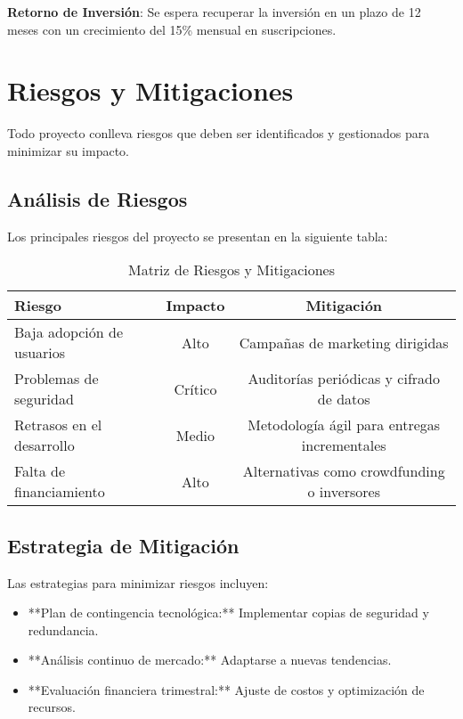 \textbf{Retorno de Inversión}: Se espera recuperar la inversión en un plazo de 12 meses con un crecimiento del 15\% mensual en suscripciones.



\section{Riesgos y Mitigaciones}

Todo proyecto conlleva riesgos que deben ser identificados y gestionados para minimizar su impacto.

\subsection{Análisis de Riesgos}
Los principales riesgos del proyecto se presentan en la siguiente tabla:

\begin{table}[h]
	\centering
	\begin{tabular}{|l|c|c|}
		\hline
		\textbf{Riesgo} & \textbf{Impacto} & \textbf{Mitigación} \\ \hline
		Baja adopción de usuarios & Alto & Campañas de marketing dirigidas \\ \hline
		Problemas de seguridad & Crítico & Auditorías periódicas y cifrado de datos \\ \hline
		Retrasos en el desarrollo & Medio & Metodología ágil para entregas incrementales \\ \hline
		Falta de financiamiento & Alto & Alternativas como crowdfunding o inversores \\ \hline
	\end{tabular}
	\caption{Matriz de Riesgos y Mitigaciones}
\end{table}

\subsection{Estrategia de Mitigación}
Las estrategias para minimizar riesgos incluyen:
\begin{itemize}
	\item **Plan de contingencia tecnológica:** Implementar copias de seguridad y redundancia.
	\item **Análisis continuo de mercado:** Adaptarse a nuevas tendencias.
	\item **Evaluación financiera trimestral:** Ajuste de costos y optimización de recursos.
\end{itemize}



